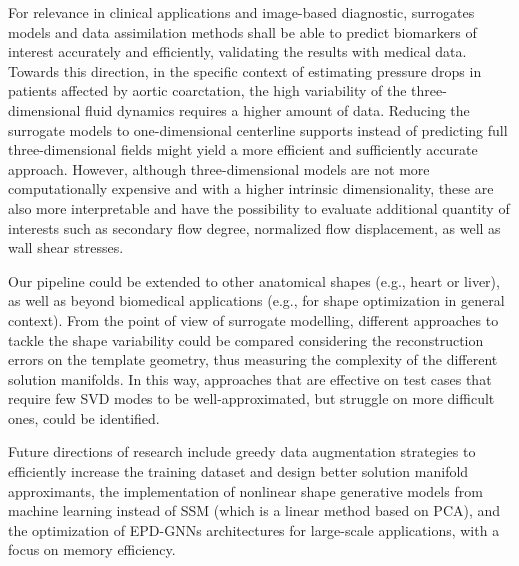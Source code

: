 For relevance in clinical applications and image-based diagnostic, surrogates models and data assimilation methods shall be able to predict biomarkers of interest accurately and efficiently, 
validating the results with medical data. Towards this direction, in the specific context of estimating pressure drops in patients affected by aortic coarctation, 
the high variability of the three-dimensional fluid dynamics requires a higher amount of data. Reducing the surrogate models to one-dimensional centerline supports instead of predicting 
full three-dimensional fields might yield a more efficient and sufficiently accurate approach. 
However, although three-dimensional models are not more computationally expensive and with a higher intrinsic dimensionality, these are also more interpretable and have the possibility to evaluate
additional quantity of interests such as secondary flow degree, normalized flow displacement, as well as wall shear stresses.

Our pipeline could be extended to other anatomical shapes (e.g., heart or liver), as well as beyond biomedical applications (e.g., for shape optimization in general context). 
From the point of view of surrogate modelling, different approaches to tackle the shape variability could be compared considering the reconstruction errors on the template geometry, thus measuring the complexity of the different solution manifolds. 
%
In this way, approaches that are effective on test cases that require few SVD modes to be well-approximated, but struggle on more difficult ones, could be identified.

Future directions of research include greedy data augmentation strategies to efficiently increase the training dataset and design better solution manifold approximants, the implementation of nonlinear shape generative models from machine learning instead of SSM (which is a linear method based on PCA), and the optimization of EPD-GNNs architectures for large-scale applications, with a focus on memory efficiency.
